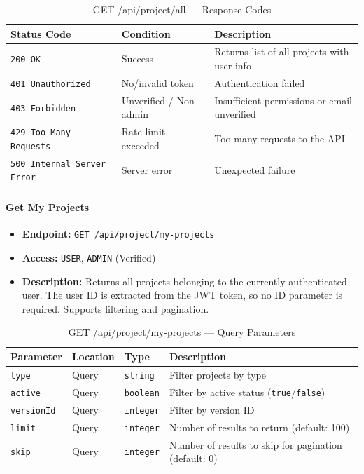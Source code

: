 \begin{table}[H]
\centering
\renewcommand{\arraystretch}{1.3}
\begin{tabularx}{\textwidth}{|l|l|X|}
\hline
\textbf{Status Code} & \textbf{Condition} & \textbf{Description} \\
\hline
\texttt{200 OK}           & Success      & Returns list of all projects with user info \\
\hline
\texttt{401 Unauthorized} & No/invalid token & Authentication failed \\
\hline
\texttt{403 Forbidden}    & Unverified / Non-admin   & Insufficient permissions or email unverified \\
\hline
\texttt{429 Too Many Requests} & Rate limit exceeded & Too many requests to the API \\
\hline
\texttt{500 Internal Server Error} & Server error & Unexpected failure \\
\hline
\end{tabularx}
\caption{GET /api/project/all — Response Codes}
\label{tab:get-all-projects-responses}
\end{table}
\FloatBarrier

\paragraph{Get My Projects}
\label{subsubsec:get-my-projects}

\begin{itemize}
  \item \textbf{Endpoint:} \texttt{GET /api/project/my-projects}
  \item \textbf{Access:} \texttt{USER}, \texttt{ADMIN} (Verified)
  \item \textbf{Description:} Returns all projects belonging to the currently
  authenticated user.
  The user ID is extracted from the JWT token, so no ID parameter
  is required. Supports filtering and pagination.
\end{itemize}

\begin{table}[H]
\centering
\renewcommand{\arraystretch}{1.3}
\begin{tabularx}{\textwidth}{|l|l|l|X|}
\hline
\textbf{Parameter} & \textbf{Location} & \textbf{Type} & \textbf{Description} \\
\hline
\texttt{type}      & Query & \texttt{string}  & Filter projects by type \\
\hline
\texttt{active}    & Query & \texttt{boolean} & Filter by active status (\texttt{true}/\texttt{false}) \\
\hline
\texttt{versionId} & Query & \texttt{integer} & Filter by version ID \\
\hline
\texttt{limit}     & Query & \texttt{integer} & Number of results to return (default: 100) \\
\hline
\texttt{skip}      & Query & \texttt{integer} & Number of results to skip for pagination (default: 0) \\
\hline
\end{tabularx}
\caption{GET /api/project/my-projects — Query Parameters}
\label{tab:get-my-projects-params}
\end{table}

